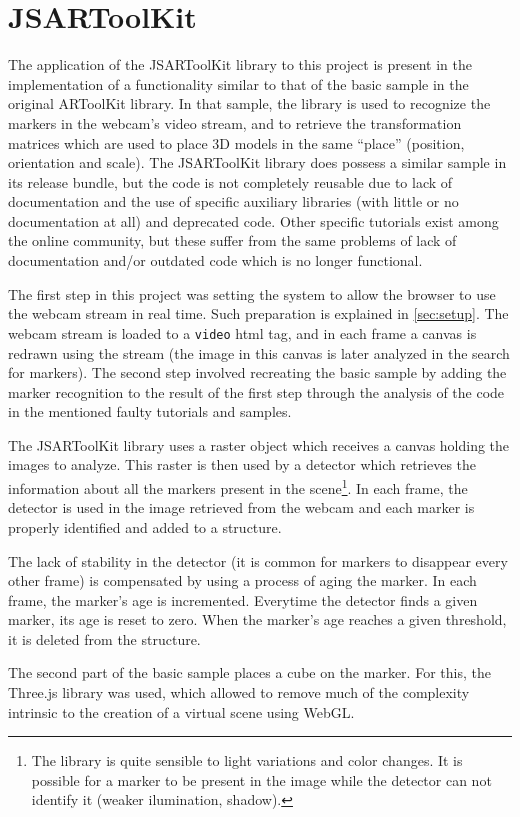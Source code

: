 \section{JSARToolKit}
\label{sec:jsartoolkit}

The application of the JSARToolKit library to this project is present in the implementation of a functionality similar to that of the basic sample in the original ARToolKit library. In that sample, the library is used to recognize the markers in the webcam's video stream, and to retrieve the transformation matrices which are used to place 3D models in the same ``place'' (position, orientation and scale). The JSARToolKit library does possess a similar sample in its release bundle, but the code is not completely reusable due to lack of documentation and the use of specific auxiliary libraries (with little or no documentation at all) and deprecated code. Other specific tutorials exist among the online community, but these suffer from the same problems of lack of documentation and/or outdated code which is no longer functional.

The first step in this project was setting the system to allow the browser to use the webcam stream in real time. Such preparation is explained in \cref{sec:setup}. The webcam stream is loaded to a \texttt{video} html tag, and in each frame a canvas is redrawn using the stream (the image in this canvas is later analyzed in the search for markers). The second step involved recreating the basic sample by adding the marker recognition to the result of the first step through the analysis of the code in the mentioned faulty tutorials and samples.


The JSARToolKit library uses a raster object which receives a canvas holding the images to analyze. This raster is then used by a detector which retrieves the information about all the markers present in the scene\footnote{The library is quite sensible to light variations and color changes. It is possible for a marker to be present in the image while the detector can not identify it (weaker ilumination, shadow).}. In each frame, the detector is used in the image retrieved from the webcam and each marker is properly identified and added to a structure.

The lack of stability in the detector (it is common for markers to disappear every other frame) is compensated by using a process of aging the marker. In each frame, the marker's age is incremented. Everytime the detector finds a given marker, its age is reset to zero. When the marker's age reaches a given threshold, it is deleted from the structure.

The second part of the basic sample places a cube on the marker. For this, the Three.js library was used, which allowed to remove much of the complexity intrinsic to the creation of a virtual scene using WebGL.

